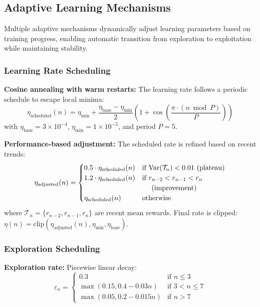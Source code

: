 \documentclass[conference]{IEEEtran}
\begin{document}
\subsection{Adaptive Learning Mechanisms}

Multiple adaptive mechanisms dynamically adjust learning parameters based on training progress, enabling automatic transition from exploration to exploitation while maintaining stability.

\subsubsection{Learning Rate Scheduling}

\textbf{Cosine annealing with warm restarts:} The learning rate follows a periodic schedule to escape local minima:
%
\begin{equation}
\eta_{\text{scheduled}}(n) = \eta_{\text{min}} + \frac{\eta_{\text{base}} - \eta_{\text{min}}}{2}\left(1 + \cos\left(\frac{\pi \cdot (n \bmod P)}{P}\right)\right)
\end{equation}
%
with $\eta_{\text{base}} = 3 \times 10^{-4}$, $\eta_{\text{min}} = 1 \times 10^{-5}$, and period $P = 5$.

\textbf{Performance-based adjustment:} The scheduled rate is refined based on recent trends:
%
\begin{equation}
\eta_{\text{adjusted}}(n) = \begin{cases}
0.5 \cdot \eta_{\text{scheduled}}(n) & \text{if } \text{Var}(\mathcal{T}_n) < 0.01 \text{ (plateau)} \\
1.2 \cdot \eta_{\text{scheduled}}(n) & \text{if } r_{n-2} < r_{n-1} < r_n \\
& \text{\hspace{1em} (improvement)} \\
\eta_{\text{scheduled}}(n) & \text{otherwise}
\end{cases}
\end{equation}
%
where $\mathcal{T}_n = \{r_{n-2}, r_{n-1}, r_n\}$ are recent mean rewards. Final rate is clipped: $\eta(n) = \text{clip}(\eta_{\text{adjusted}}(n), \eta_{\text{min}}, \eta_{\text{base}})$.

\subsubsection{Exploration Scheduling}

\textbf{Exploration rate:} Piecewise linear decay:
%
\begin{equation}
\varepsilon_n = \begin{cases}
0.3 & \text{if } n \leq 3 \\
\max(0.15, 0.4 - 0.03n) & \text{if } 3 < n \leq 7 \\
\max(0.05, 0.2 - 0.015n) & \text{if } n > 7
\end{cases}
\end{equation}
\end{document}

